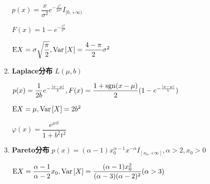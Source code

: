 \begin{enumerate}
$ p(x) = \dfrac{x}{\sigma^2}e^{-\frac{x^2}{2\sigma^2}}I_{[0,+\infty)}$

$ F(x) = 1-e^{-\frac{x^2}{\sigma^2}}$

$ \text{E}X = \sigma\sqrt{\dfrac{\pi}{2}}, \text{Var}\left[X\right] = \dfrac{4-\pi}{2}\sigma^2$

\item \textbf{Laplace分布} $ L(\mu,b)$

  $ p(x)=\dfrac{1}{2b}e^{-\frac{|x-\mu|}{b}}, F(x)=\dfrac{1+\operatorname{sgn}(x-\mu)}{2}(1-e^{-\frac{|x-\mu|}{b}})$

  $ \text{E}X = \mu, \text{Var}\left[X\right] = 2b^2$

  $ \varphi(x) = \dfrac{e^{\mu it}}{1+b^2t^2}$


\item \textbf{Pareto分布}
  $ p(x) = (\alpha-1)x_0^{\alpha-1}x^{-\alpha}I_{[x_0,+\infty]}, \alpha>2, x_0>0$

  $ \text{E}X = \dfrac{\alpha-1}{\alpha-2}x_0, \text{Var}\left[X\right] = \dfrac{(\alpha-1)x_0^2}{(\alpha-3)(\alpha-2)^2}(\alpha>3)$

  \end{enumerate}

